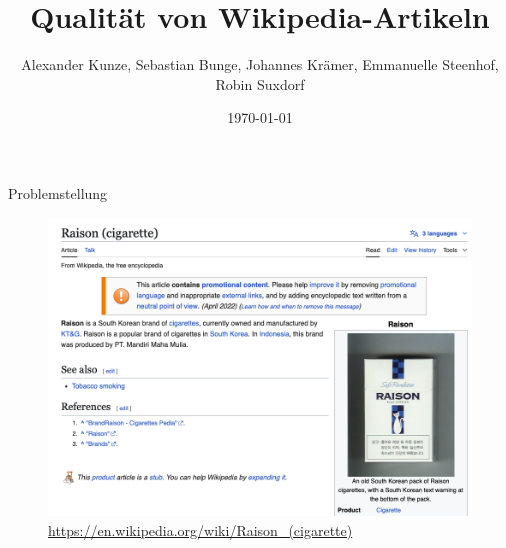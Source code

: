 \documentclass[aspectratio=169]{beamer} %
\title{Qualit\"at von Wikipedia-Artikeln}
\author[]{Alexander Kunze, Sebastian Bunge, Johannes Kr\"amer, Emmanuelle Steenhof, Robin Suxdorf}
\institute{Artificial Intelligence Group,\\
University of Hagen, Germany}
\date{\today}
\begin{document}




\begin{frame}
    \titlepage
\end{frame}
\nologo

\begin{frame}{Problemstellung}
    \begin{figure}
        \centering
        \includegraphics[width=0.6\linewidth]{figures/example_promo_article.png}
        \caption{\url{https://en.wikipedia.org/wiki/Raison\_(cigarette)}}
        \label{fig:enter-label}
    \end{figure}
\end{frame}
\end{document}
